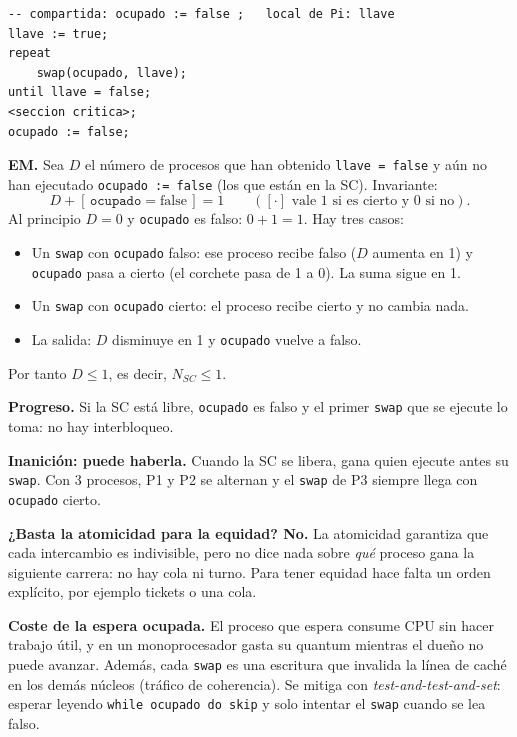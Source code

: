 \documentclass[11pt,a4paper,oneside]{report}
\begin{document}
\begin{solucion}
\begin{lstlisting}
-- compartida: ocupado := false ;   local de Pi: llave
llave := true;
repeat
    swap(ocupado, llave);
until llave = false;
<seccion critica>;
ocupado := false;
\end{lstlisting}
\textbf{EM.} Sea $D$ el número de procesos que han obtenido \texttt{llave = false} y aún no han ejecutado
\texttt{ocupado := false} (los que están en la SC). Invariante:
\[
D + [\,\texttt{ocupado} = \text{false}\,] = 1 \qquad ([\cdot] \text{ vale 1 si es cierto y 0 si no}).
\]
Al principio $D = 0$ y \texttt{ocupado} es falso: $0 + 1 = 1$. Hay tres casos:
\begin{itemize}[leftmargin=*,noitemsep]
  \item Un \texttt{swap} con \texttt{ocupado} falso: ese proceso recibe falso ($D$ aumenta en 1) y
        \texttt{ocupado} pasa a cierto (el corchete pasa de 1 a 0). La suma sigue en 1.
  \item Un \texttt{swap} con \texttt{ocupado} cierto: el proceso recibe cierto y no cambia nada.
  \item La salida: $D$ disminuye en 1 y \texttt{ocupado} vuelve a falso.
\end{itemize}
Por tanto $D \le 1$, es decir, $N_{SC} \le 1$.

\textbf{Progreso.} Si la SC está libre, \texttt{ocupado} es falso y el primer \texttt{swap} que se ejecute lo toma:
no hay interbloqueo.

\textbf{Inanición: puede haberla.} Cuando la SC se libera, gana quien ejecute antes su \texttt{swap}. Con 3 procesos,
P1 y P2 se alternan y el \texttt{swap} de P3 siempre llega con \texttt{ocupado} cierto.

\textbf{¿Basta la atomicidad para la equidad? No.} La atomicidad garantiza que cada intercambio es indivisible,
pero no dice nada sobre \emph{qué} proceso gana la siguiente carrera: no hay cola ni turno. Para tener equidad hace
falta un orden explícito, por ejemplo tickets o una cola.

\textbf{Coste de la espera ocupada.} El proceso que espera consume CPU sin hacer trabajo útil, y en un
monoprocesador gasta su quantum mientras el dueño no puede avanzar. Además, cada \texttt{swap} es una escritura que
invalida la línea de caché en los demás núcleos (tráfico de coherencia). Se mitiga con
\emph{test-and-test-and-set}: esperar leyendo \texttt{while ocupado do skip} y solo intentar el \texttt{swap}
cuando se lea falso.
\end{solucion}
\end{document}
